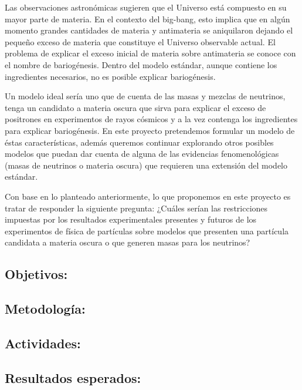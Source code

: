 \begin{evaluador}
Las observaciones astronómicas sugieren que el Universo está compuesto
en su mayor parte de materia. En el contexto del big-bang, esto
implica que en algún momento grandes cantidades de materia y
antimateria se aniquilaron dejando el pequeño exceso de materia que
constituye el Universo observable actual. El problema de explicar el
exceso inicial de materia sobre antimateria se conoce con el nombre de
bariogénesis. Dentro del modelo estándar, aunque contiene los
ingredientes necesarios, no es posible explicar bariogénesis.
\end{evaluador}
Un modelo ideal sería uno que de cuenta de las masas y mezclas de
neutrinos, tenga un candidato a materia oscura que sirva para explicar
el exceso de positrones en experimentos de rayos cósmicos y a la vez
contenga los ingredientes para explicar bariogénesis.  En este
proyecto pretendemos formular un modelo de éstas características,
además queremos continuar explorando otros posibles modelos que puedan
dar cuenta de alguna de las evidencias fenomenológicas (masas de
neutrinos o materia oscura) que requieren una extensión del modelo
estándar.


\begin{proyecto}
  Con base en lo planteado anteriormente, lo que proponemos en este
  proyecto es tratar de responder la siguiente pregunta: ¿Cuáles
  serían las restricciones impuestas por los resultados experimentales
  presentes y futuros de los experimentos de física de partículas
  sobre modelos que presenten una partícula candidata a materia oscura
  o que generen masas para los neutrinos?
\end{proyecto}
 

\subsection{Objetivos:                                     }
\subsection{Metodología:                                   }
\subsection{Actividades:                                   }
\subsection{Resultados esperados:                          }
